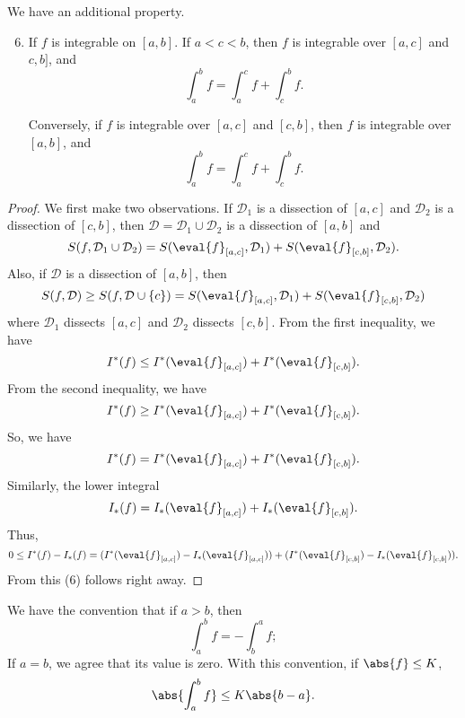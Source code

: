 We have an additional property.
\begin{enumerate}
    \setcounter{enumi}{5}
    \item If \(f\) is integrable on \([a,b]\). If \(a < c < b\), then \(f\) is integrable over \([a,c]\) and \(c, b]\), and
    \[
        \int^b_a f = \int^c_a f + \int^b_c f.
    \]

    Conversely, if \(f\) is integrable over \([a,c]\) and \([c,b]\), then \(f\) is integrable over \([a,b]\), and
    \[
        \int^b_a f = \int^c_a f + \int^b_c f.
    \]
\end{enumerate}
\begin{proof}
    We first make two observations. If \(\mathcal{D}_1\) is a dissection of \([a,c]\) and \(\mathcal{D}_2\) is a dissection of \([c,b]\), then \(\mathcal{D} = \mathcal{D}_1 \cup \mathcal{D}_2\) is a dissection of \([a,b]\) and
    \[
        S(f, \mathcal{D}_1 \cup \mathcal{D}_2) = S(\eval{f}_{[a,c]},\mathcal{D}_1) + S(\eval{f}_{[c,b]},\mathcal{D}_2).
    \]
    Also, if \(\mathcal{D}\) is a dissection of \([a,b]\), then
    \[
        S(f,\mathcal{D}) \geq S(f, \mathcal{D}\cup \{c\}) = S(\eval{f}_{[a,c]},\mathcal{D}_1) + S(\eval{f}_{[c,b]},\mathcal{D}_2)
    \]
    where \(\mathcal{D}_1\) dissects \([a,c]\) and \(\mathcal{D}_2\) dissects \([c,b]\). From the first inequality, we have
    \[
        I^*(f) \leq I^*(\eval{f}_{[a,c]}) + I^*(\eval{f}_{[c,b]}).
    \]
    From the second inequality, we have
    \[
        I^*(f) \geq I^*(\eval{f}_{[a,c]}) + I^*(\eval{f}_{[c,b]}).
    \]
    So, we have
    \[
        I^*(f) = I^*(\eval{f}_{[a,c]}) + I^*(\eval{f}_{[c,b]}).
    \]
    Similarly, the lower integral
    \[
        I_*(f) = I_*(\eval{f}_{[a,c]}) + I_*(\eval{f}_{[c,b]}).
    \]
    Thus,
    \[
        0\leq I^*(f) - I_*(f) = (I^*(\eval{f}_{[a,c]}) - I_*(\eval{f}_{[a,c]})) + (I^*(\eval{f}_{[c,b]}) - I_*(\eval{f}_{[c,b]})).
    \]
    From this (6) follows right away.
\end{proof}
We have the convention that if \(a > b\), then
\[
    \int^b_a f = - \int^a_b f;
\]
If \(a = b\), we agree that its value is zero. With this convention, if \(\abs{f}\leq K\),
\[
    \abs{\int^b_a f}\leq K \abs{b - a}.
\]
